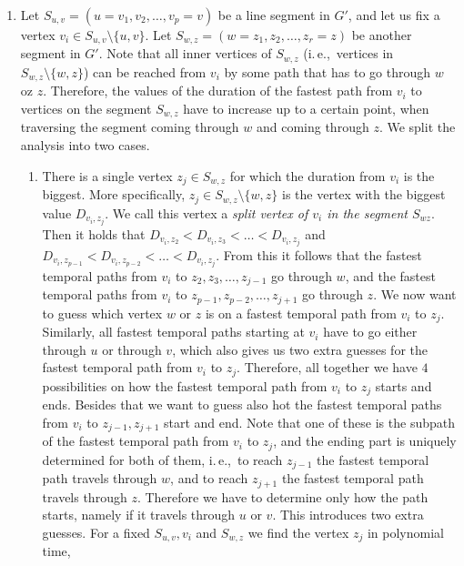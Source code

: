 \documentclass[11pt,a4paper]{article}
\theoremstyle{remark}
\theoremstyle{definition}
\newcommand{\ie}{i.\,e.,\ }
\begin{document}
\begin{enumerate}
    \item \label{FPT:guess-splitFromAnotherSegmentAndPaths}
    Let $S_{u,v} = (u=v_1,v_2, \dots, v_p = v)$ be a line segment in $G'$, and let us
    fix a vertex $v_i \in S_{u,v} \setminus \{u,v\}$.
    Let 
    $S_{w,z} = (w=z_1,z_2, \dots, z_r = z)$ be another segment in $G'$.
    Note that all inner vertices of $S_{w,z}$ (\ie vertices in $S_{w,z} \setminus \{w,z\}$)
    can be reached from $v_i$ by some path that has to go through $w$ oz $z$.
    Therefore, the values of the duration of the fastest path from $v_i$ to vertices on 
    the segment
    $S_{w,z}$ have to increase up to a certain point, when traversing the segment coming through $w$ and coming through $z$.
    We split the analysis into two cases.
    \begin{enumerate}
        \item 
    There is a single vertex $z_j \in S_{w,z}$ for which the duration from $v_i$ is the biggest.
    More specifically, $z_j \in S_{w,z} \setminus \{w,z\}$ is the vertex with the biggest value  $D_{v_i,z_j}$.
    We call this vertex a \emph{split vertex of $v_i$ in the segment $S_{wz}$}.
    Then it holds that $D_{v_i,z_2} < D_{v_i,z_3} < \dots < D_{v_i,z_j}$ and 
    $D_{v_i,z_{p-1}} < D_{v_i,z_{p-2}} < \dots < D_{v_i,z_j}$.
    From this it follows that the fastest temporal paths from $v_i$ to $z_2, z_3, \dots, z_{j-1}$ go through $w$,
    and 
    the fastest temporal paths from $v_i$ to $z_{p-1}, z_{p-2}, \dots, z_{j+1}$ go through $z$.
    We now want to guess which vertex $w$ or $z$ is on a fastest temporal path from $v_i$ to $z_j$.
    Similarly,
    all fastest temporal paths starting at $v_i$ have to go either through $u$ or through $v$,
    which also gives us two extra guesses for the fastest temporal path from $v_i$ to $z_j$.
    Therefore, all together we have $4$ possibilities on how the fastest temporal path from $v_i$ to $z_j$ starts and ends.
    Besides that we want to guess also hot the fastest temporal paths from $v_i$ to $z_{j-1}, z_{j+1}$ start and end.
    Note that one of these is the subpath of the fastest temporal path from $v_i$ to $z_j$, and the ending part is uniquely determined for both of them,
    \ie to reach $z_{j-1}$ the fastest temporal path travels through $w$, and to reach $z_{j+1}$ the fastest temporal path travels through $z$.
    Therefore we have to determine only how the path starts, namely if it travels through $u$ or $v$.
    This introduces two extra guesses.
    For a fixed $S_{u,v}, v_i$ and $S_{w,z}$ we find the vertex $z_j$ in polynomial time, 

\end{enumerate}
\end{enumerate}
\end{document}
